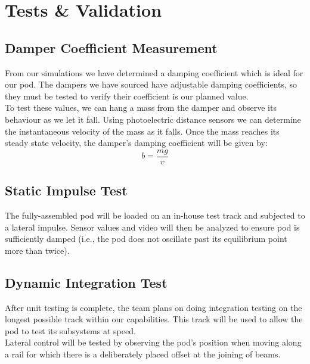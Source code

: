 \documentclass[main.tex]{subfiles}
\begin{document}
    \section{Tests \& Validation }
    \subsection{Damper Coefficient Measurement}
    From our simulations we have determined a damping coefficient which is ideal for our pod. The dampers we have sourced have adjustable damping coefficients, so they must be tested to verify their coefficient is our planned value.\\
    To test these values, we can hang a mass from the damper and observe its behaviour as we let it fall. Using photoelectric distance sensors we can determine the instantaneous velocity of the mass as it falls. Once the mass reaches its steady state velocity, the damper's damping coefficient will be given by:
	\[
     b = \frac{mg}{v}
    \]
    \subsection{Static Impulse Test}
    The fully-assembled pod will be loaded on an in-house test track and subjected to a lateral impulse. Sensor values and video will then be analyzed to ensure pod is sufficiently damped (i.e., the pod does not oscillate past its equilibrium point more than twice).
    \subsection{Dynamic Integration Test}
    After unit testing is complete, the team plans on doing integration testing on the longest possible track within our capabilities. This track will be used to allow the pod to test its subsystems at speed.\\
    Lateral control will be tested by observing the pod's position when moving along a rail for which there is a deliberately placed offset at the joining of beams.
\end{document}
